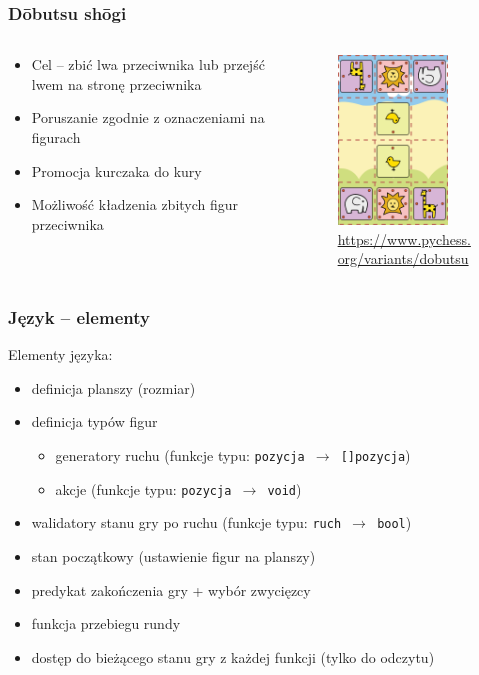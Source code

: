 \documentclass{beamer}
\begin{document}
\begin{frame}
	\frametitle{Dōbutsu shōgi}
	\begin{columns}
		\begin{column}{.48\textwidth}
			\begin{itemize}
				\item Cel -- zbić lwa przeciwnika lub przejść lwem na stronę przeciwnika
				\item Poruszanie zgodnie z oznaczeniami na figurach
				\item Promocja kurczaka do kury
				\item Możliwość kładzenia zbitych figur przeciwnika
			\end{itemize}
		\end{column}%
		\hfill
		\begin{column}{.60\textwidth}
			\begin{figure}
				\includegraphics[height=4.5cm]{dobutsu-shogi.png}
				\centering
				\caption{\url{https://www.pychess.org/variants/dobutsu}}
			\end{figure}
		\end{column}
	\end{columns}
\end{frame}

\begin{frame}
	\frametitle{Język -- elementy}
	Elementy języka:
	\begin{itemize}
		\item definicja planszy (rozmiar)
		\item definicja typów figur
		      \begin{itemize}
			      \item generatory ruchu (funkcje typu: {\tt pozycja $\rightarrow$ []pozycja})
			      \item akcje (funkcje typu: {\tt pozycja $\rightarrow$ void})
		      \end{itemize}
		\item walidatory stanu gry po ruchu (funkcje typu: {\tt ruch $\rightarrow$ bool})
		\item stan początkowy (ustawienie figur na planszy)
		\item predykat zakończenia gry + wybór zwycięzcy
		\item funkcja przebiegu rundy
		\item dostęp do bieżącego stanu gry z każdej funkcji (tylko do odczytu)
	\end{itemize}
\end{frame}
\end{document}
